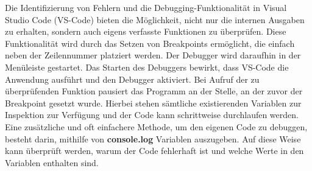 Die Identifizierung von Fehlern und die Debugging-Funktionalität in Visual Studio Code (VS-Code) bieten die Möglichkeit, nicht nur die internen Ausgaben zu erhalten, sondern auch eigens verfasste Funktionen zu überprüfen. Diese Funktionalität wird durch das Setzen von Breakpoints ermöglicht, die einfach neben der Zeilennummer platziert werden. Der Debugger wird daraufhin in der Menüleiste gestartet. Das Starten des Debuggers bewirkt, dass VS-Code die Anwendung ausführt und den Debugger aktiviert. Bei Aufruf der zu überprüfenden Funktion pausiert das Programm an der Stelle, an der zuvor der Breakpoint gesetzt wurde. Hierbei stehen sämtliche existierenden Variablen zur Inspektion zur Verfügung und der Code kann schrittweise durchlaufen werden.
\newline
Eine zusätzliche und oft einfachere Methode, um den eigenen Code zu debuggen, besteht darin, mithilfe von \textbf{console.log} Variablen auszugeben. Auf diese Weise kann überprüft werden, warum der Code fehlerhaft ist und welche Werte in den Variablen enthalten sind.
\cite{express_js_debugging}
